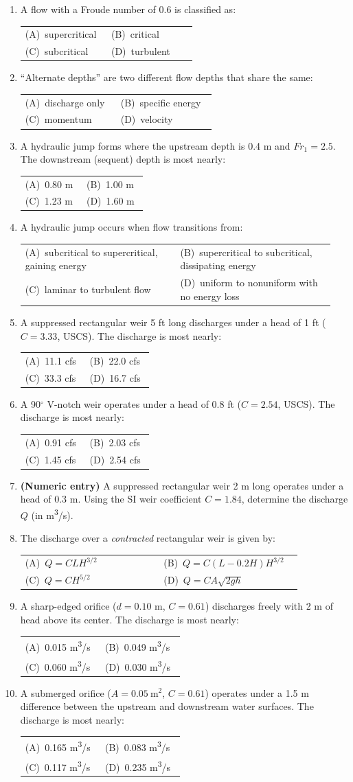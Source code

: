 \documentclass[11pt]{article}
\makeatletter
\newcommand{\opts}[4]{%
\par\nobreak\vspace{3pt}%
\noindent\begin{tabular}{@{}p{0.47\linewidth}p{0.47\linewidth}@{}}
(A)~#1 & (B)~#2 \\[3pt]
(C)~#3 & (D)~#4 \\
\end{tabular}\par\vspace{3pt}}
\makeatother
\begin{document}
\begin{enumerate}[leftmargin=1.6em,itemsep=8pt]
\item A flow with a Froude number of 0.6 is classified as:
\opts{supercritical}{critical}{subcritical}{turbulent}

\item ``Alternate depths'' are two different flow depths that share the same:
\opts{discharge only}{specific energy}{momentum}{velocity}

\item A hydraulic jump forms where the upstream depth is 0.4 m and $Fr_1=2.5$. The downstream (sequent) depth is most nearly:
\opts{0.80 m}{1.00 m}{1.23 m}{1.60 m}

\item A hydraulic jump occurs when flow transitions from:
\opts{subcritical to supercritical, gaining energy}{supercritical to subcritical, dissipating energy}{laminar to turbulent flow}{uniform to nonuniform with no energy loss}

\item A suppressed rectangular weir 5 ft long discharges under a head of 1 ft ($C=3.33$, USCS). The discharge is most nearly:
\opts{11.1 cfs}{22.0 cfs}{33.3 cfs}{16.7 cfs}

\item A 90$^{\circ}$ V-notch weir operates under a head of 0.8 ft ($C=2.54$, USCS). The discharge is most nearly:
\opts{0.91 cfs}{2.03 cfs}{1.45 cfs}{2.54 cfs}

\item \textbf{(Numeric entry)} A suppressed rectangular weir 2 m long operates under a head of 0.3 m. Using the SI weir coefficient $C=1.84$, determine the discharge $Q$ (in m\textsuperscript{3}/s).

\item The discharge over a \emph{contracted} rectangular weir is given by:
\opts{$Q=CLH^{3/2}$}{$Q=C(L-0.2H)H^{3/2}$}{$Q=CH^{5/2}$}{$Q=CA\sqrt{2gh}$}

\item A sharp-edged orifice ($d=0.10$ m, $C=0.61$) discharges freely with 2 m of head above its center. The discharge is most nearly:
\opts{0.015 m\textsuperscript{3}/s}{0.049 m\textsuperscript{3}/s}{0.060 m\textsuperscript{3}/s}{0.030 m\textsuperscript{3}/s}

\item A submerged orifice ($A=0.05~\mathrm{m^2}$, $C=0.61$) operates under a 1.5 m difference between the upstream and downstream water surfaces. The discharge is most nearly:
\opts{0.165 m\textsuperscript{3}/s}{0.083 m\textsuperscript{3}/s}{0.117 m\textsuperscript{3}/s}{0.235 m\textsuperscript{3}/s}


\end{enumerate}
\end{document}

